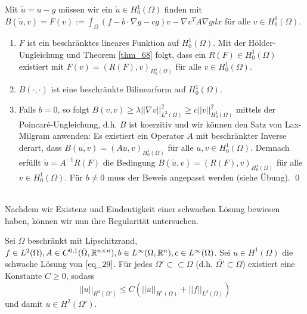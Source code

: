 	Mit $\tilde{u} = u-g$ müssen wir ein $\tilde{u} \in H_0^1(\Omega)$ finden mit $B(\tilde{u},v) = F(v) := \int_{\Omega} (f-b\cdot \nabla g - cg)v - \nabla v^T A \nabla g dx$ für alle $v \in H_0^1(\Omega)$.
	\begin{enumerate}[1.]
		\item $F$ ist ein beschränktes lineares Funktion auf $H_0^1(\Omega)$. Mit der Hölder-Ungleichung und Theorem \eqref{thm_68} folgt, dass ein $R(F) \in H_0^1(\Omega)$ existiert mit $F(v) = (R(F),v)_{H_0^1(\Omega)}$ für alle $v \in H_0^1(\Omega)$.
		\item $B(\cdot,\cdot)$ ist eine beschränkte Bilinearform auf $H_0^1(\Omega)$.
		\item Falls $b = 0$, so folgt $B(v,v) \geq \lambda ||\nabla v||_{L^2(\Omega)}^2 \geq c ||v||_{H_0^1(\Omega)}^2$ mittels der Poincaré-Ungleichung, d.h. $B$ ist koerzitiv und wir können den Satz von Lax-Milgram anwenden: Es existiert ein Operator $A$ mit beschränkter Inverse derart, dass $B(u,v) = (Au,v)_{H_0^1(\Omega)}$ für alle $u,v \in H_0^1(\Omega)$. Demnach erfüllt $\tilde{u} = A^{-1} R(F)$ die Bedingung $B(\tilde{u},v) = (R(F),v)_{H_0^1(\Omega)}$ für alle $v \in H_0^1(\Omega)$. Für $b \neq 0$ muss der Beweis angepasst werden (siehe Übung). \qed
	\end{enumerate}

\mbox{} \\
Nachdem wir Existenz und Eindeutigkeit einer schwachen Lösung bewiesen haben, können wir nun ihre Regularität untersuchen.

\begin{thm} \label{thm_72}
	Sei $\Omega$ beschränkt mit Lipschitzrand,\marginnote{[72]} $f \in L^2(\Omega), A \in C^{0,1}(\bar{\Omega},\mathbb{R}^{n \times n}), b \in L^\infty(\Omega,\mathbb{R}^n), c \in L^\infty(\Omega)$. Sei $u \in H^1(\Omega)$ die schwache Lösung von $\eqref{eq_29}$. Für jedes $\Omega' \subset \subset \Omega$ (d.h. $\overline{\Omega'} \subset \Omega$) existiert eine Konstante $C \geq 0$, sodass
	\[ ||u||_{H^2(\Omega')} \leq C(||u||_{H^1(\Omega)} + ||f||_{L^2(\Omega)}) \]
	und damit $u \in H^2(\Omega')$.
\end{thm}

